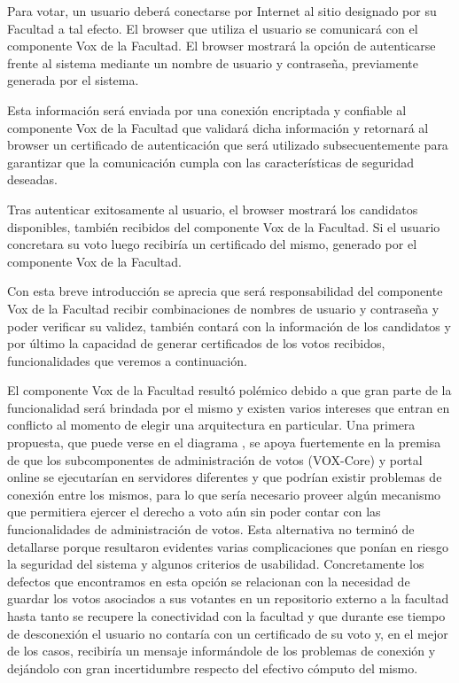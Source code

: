 Para votar, un usuario deberá conectarse por Internet al sitio designado por su Facultad a tal efecto. El browser que utiliza el usuario se comunicará con el componente Vox de la Facultad. El browser mostrará la opción de autenticarse frente al sistema mediante un nombre de usuario y contraseña, previamente generada por el sistema.

Esta información será enviada por una conexión encriptada y confiable al componente Vox de la Facultad que validará dicha información y retornará al browser un certificado de autenticación que será utilizado subsecuentemente para garantizar que la comunicación cumpla con las características de seguridad deseadas.

Tras autenticar exitosamente al usuario, el browser mostrará los candidatos disponibles, también recibidos del componente Vox de la Facultad. Si el usuario concretara su voto luego recibiría un certificado del mismo, generado por el componente Vox de la Facultad.

Con esta breve introducción se aprecia que será responsabilidad del componente Vox de la Facultad recibir combinaciones de nombres de usuario y contraseña y poder verificar su validez, también contará con la información de los candidatos y por último la capacidad de generar certificados de los votos recibidos, funcionalidades que veremos a continuación.


El componente Vox de la Facultad resultó polémico debido a que gran parte de la funcionalidad será brindada por el mismo y existen varios intereses que entran en conflicto al momento de elegir una arquitectura en particular. Una primera propuesta, que puede verse en el diagrama %
, se apoya fuertemente en la premisa de que los subcomponentes de administración de votos (VOX-Core) y portal online se ejecutarían en servidores diferentes y que podrían existir problemas de conexión entre los mismos, para lo que sería necesario proveer algún mecanismo que permitiera ejercer el derecho a voto aún sin poder contar con las funcionalidades de administración de votos. Esta alternativa no terminó de detallarse porque resultaron evidentes varias complicaciones que ponían en riesgo la seguridad del sistema y algunos criterios de usabilidad. Concretamente los defectos que encontramos en esta opción se relacionan con la necesidad de guardar los votos asociados a sus votantes en un repositorio externo a la facultad hasta tanto se recupere la conectividad con la facultad y que durante ese tiempo de desconexión el usuario no contaría con un certificado de su voto y, en el mejor de los casos, recibiría un mensaje informándole de los problemas de conexión y dejándolo con gran incertidumbre respecto del efectivo cómputo del mismo.


